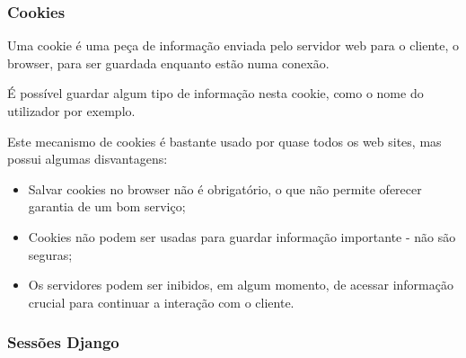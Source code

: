 \documentclass{article}
\begin{document}
\subsubsection{Cookies}

\begin{flushleft}
  Uma cookie é uma peça de informação enviada pelo servidor web para o cliente,
  o browser, para ser guardada enquanto estão numa conexão.

  \vspace{2mm}

  É possível guardar algum tipo de informação nesta cookie, como o nome do
  utilizador por exemplo.

  \vspace{2mm}

  Este mecanismo de cookies é bastante usado por quase todos os web sites, mas
  possui algumas disvantagens:
  \begin{itemize}
    \item Salvar cookies no browser não é obrigatório, o que não permite
    oferecer garantia de um bom serviço;
    \item Cookies não podem ser usadas para guardar informação importante - não são seguras;
    \item Os servidores podem ser inibidos, em algum momento, de acessar informação crucial
    para continuar a interação com o cliente.
  \end{itemize}
\end{flushleft}

\pagebreak

\subsubsection{Sessões Django}
\end{document}
